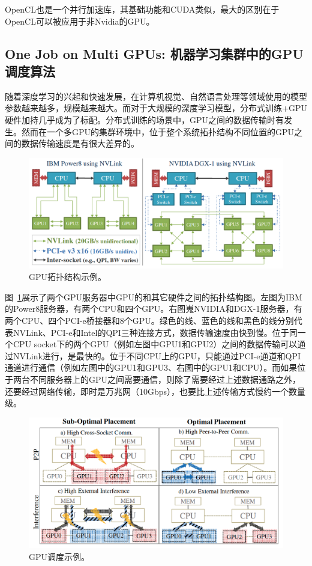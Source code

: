 OpenCL也是一个并行加速库，其基础功能和CUDA类似，最大的区别在于OpenCL可以被应用于非Nvidia的GPU。

\subsection{One Job on Multi GPUs: 机器学习集群中的GPU调度算法}
随着深度学习的兴起和快速发展，在计算机视觉、自然语言处理等领域使用的模型参数越来越多，规模越来越大。而对于大规模的深度学习模型，分布式训练+GPU硬件加持几乎成为了标配。分布式训练的场景中，GPU之间的数据传输时有发生。然而在一个多GPU的集群环境中，位于整个系统拓扑结构不同位置的GPU之间的数据传输速度是有很大差异的。

\begin{figure}[h]
    \centerline{\includegraphics[width=\textwidth]{figures/gpu-topology.png}}
    \caption{GPU拓扑结构示例。}
    \label{gpu_topology}
\end{figure}

图~\ref{gpu_topology}展示了两个GPU服务器中GPU的和其它硬件之间的拓扑结构图。左图为IBM的Power8服务器，有两个CPU和四个GPU。右图嵬NVIDIA和DGX-1服务器，有两个CPU、四个PCI-e桥接器和8个GPU。绿色的线、蓝色的线和黑色的线分别代表NVLink、PCI-e和Intel的QPI三种连接方式，数据传输速度由快到慢。位于同一个CPU socket下的两个GPU（例如左图中GPU1和GPU2）之间的数据传输可以通过NVLink进行，是最快的。位于不同CPU上的GPU，只能通过PCI-e通道和QPI通道进行通信（例如左图中的GPU1和GPU3、右图中的GPU1和CPU）。而如果位于两台不同服务器上的GPU之间需要通信，则除了需要经过上述数据通路之外，还要经过网络传输，即时是万兆网（10Gbps），也要比上述传输方式慢约一个数量级。

\begin{figure}[h]
    \centerline{\includegraphics[width=\textwidth]{figures/gpu-top-sub-opt.png}}
    \caption{GPU调度示例。}
    \label{gpu_top_sub_opt}
\end{figure}


